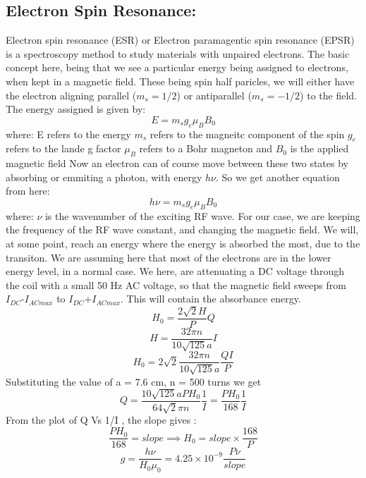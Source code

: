 \begin{Abstract:}
\subsection{Electron Spin Resonance:}
	Electron spin resonance (ESR) or Electron paramagentic spin resonance (EPSR) is a spectroscopy method to study materials with unpaired electrons. The basic concept here, being that we see a particular energy being assigned to electrons, when kept in a magnetic field. These being spin half paricles, we will either have the electron aligning parallel ($m_s = 1/2$) or antiparallel ($m_s = -1/2$) to the field. The energy assigned is given by:
	\begin{equation}
		E = m_s g_e \mu_B B_0
	\end{equation}
	where:
	\newline E refers to the energy
	\newline $m_s$ refers to the magneitc component of the spin
	\newline $g_e$ refers to the lande g factor
	\newline $\mu_B$ refers to a Bohr magneton
	\newline and $B_0$ is the applied magnetic field
	Now an electron can of course move between these two states by absorbing or emmiting a photon, with energy $h\nu$. So we get another equation from here:
	\begin{equation}
		h\nu=m_s g_e \mu_B B_0
	\end{equation}
	where:
	\newline $\nu$ is the wavenumber of the exciting RF wave.
	For our case, we are keeping the frequency of the RF wave constant, and changing the magnetic field. We will, at some point, reach an energy where the energy is absorbed the most, due to the transiton. We are assuming here that most of the electrons are in the lower energy level, in a normal case.
	We here, are attenuating a DC voltage through the coil with a small 50 Hz AC voltage, so that the magnetic field sweeps from $I_{DC}$-$I_{AC max}$ to $I_{DC}$+$I_{AC max}$. This will contain the absorbance energy.
	\begin{equation}
	H_0 = \frac{2\sqrt{2}H}{P}Q
	\end{equation}
	\begin{equation}\label{key}
	H=\frac{32\pi n}{10\sqrt{125}a}I
	\end{equation}
	\begin{equation}\label{key}
	H_0=2\sqrt{2}\frac{32\pi n}{10\sqrt{125}a}\frac{QI}{P}
	\end{equation}
	Substituting the value of a = 7.6 cm, n = 500 turns we get
	\begin{equation}\label{key}
	Q=\frac{10\sqrt{125}a PH_0}{64\sqrt{2}\pi n }\frac{1}{I}=\frac{PH_0}{168}\frac{1}{I} 
	\end{equation}
	From the plot of Q Vs 1/I , the slope gives : 
	\begin{equation}\label{key}
	 \frac{PH_0}{168}=slope \implies H_0=slope \times \frac{168}{P}
	\end{equation}
	\begin{equation}\label{eq}
	g=\frac{h \nu}{H_0 \mu_0} = 4.25\times10^{-9} \frac{P \nu}{slope}
	\end{equation}

\end{Abstract:}
